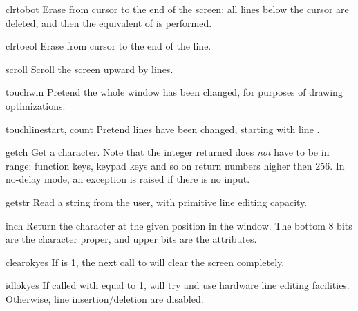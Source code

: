 \begin{methoddesc}{clrtobot}{}
Erase from cursor to the end of the screen: all lines below the cursor
are deleted, and then the equivalent of  is performed.
\end{methoddesc}

\begin{methoddesc}{clrtoeol}{}
Erase from cursor to the end of the line.
\end{methoddesc}

\begin{methoddesc}{scroll}{}
Scroll the screen upward by  lines.
\end{methoddesc}

\begin{methoddesc}{touchwin}{}
Pretend the whole window has been changed, for purposes of drawing
optimizations.
\end{methoddesc}

\begin{methoddesc}{touchline}{start, count}
Pretend  lines have been changed, starting with line
.
\end{methoddesc}

\begin{methoddesc}{getch}{}
Get a character. Note that the integer returned does \emph{not} have to
be in \ASCII{} range: function keys, keypad keys and so on return numbers
higher then 256. In no-delay mode, an exception is raised if there is 
no input.
\end{methoddesc}

\begin{methoddesc}{getstr}{}
Read a string from the user, with primitive line editing capacity.
\end{methoddesc}

\begin{methoddesc}{inch}{}
Return the character at the given position in the window. The bottom
8 bits are the character proper, and upper bits are the attributes.
\end{methoddesc}

\begin{methoddesc}{clearok}{yes}
If  is 1, the next call to 
will clear the screen completely.
\end{methoddesc}

\begin{methoddesc}{idlok}{yes}
If called with  equal to 1,  will try and use
hardware line editing facilities. Otherwise, line insertion/deletion
are disabled.
\end{methoddesc}

